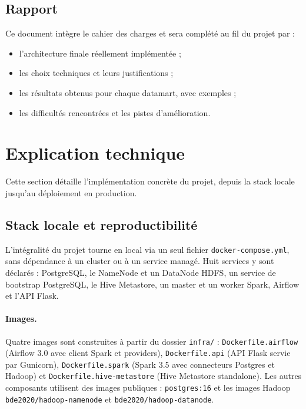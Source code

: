 \documentclass[11pt,a4paper]{article}
\begin{document}
\subsection{Rapport}

Ce document intègre le cahier des charges et sera complété au fil du projet par :

\begin{itemize}
    \item l'architecture finale réellement implémentée ;
    \item les choix techniques et leurs justifications ;
    \item les résultats obtenus pour chaque datamart, avec exemples ;
    \item les difficultés rencontrées et les pistes d'amélioration.
\end{itemize}

\newpage
\section{Explication technique}

Cette section détaille l'implémentation concrète du projet, depuis la stack locale jusqu'au déploiement en production.

\subsection{Stack locale et reproductibilité}

L'intégralité du projet tourne en local via un seul fichier \texttt{docker-compose.yml}, sans dépendance à un cluster ou à un service managé. Huit services y sont déclarés : PostgreSQL, le NameNode et un DataNode HDFS, un service de bootstrap PostgreSQL, le Hive Metastore, un master et un worker Spark, Airflow et l'API Flask.

\paragraph{Images.} Quatre images sont construites à partir du dossier \texttt{infra/} : \texttt{Dockerfile.airflow} (Airflow 3.0 avec client Spark et providers), \texttt{Dockerfile.api} (API Flask servie par Gunicorn), \texttt{Dockerfile.spark} (Spark 3.5 avec connecteurs Postgres et Hadoop) et \texttt{Dockerfile.hive-metastore} (Hive Metastore standalone). Les autres composants utilisent des images publiques : \texttt{postgres:16} et les images Hadoop \texttt{bde2020/hadoop-namenode} et \texttt{bde2020/hadoop-datanode}.
\end{document}
